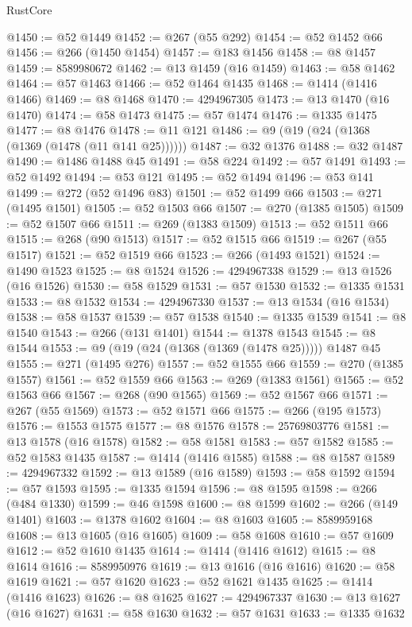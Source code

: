 \begin{lexlean}{RustCore}
\begin{coremodule}
@1450 := @52 @1449
@1452 := @267 (@55 @292)
@1454 := @52 @1452 @66
@1456 := @266 (@1450 @1454)
@1457 := @183 @1456
@1458 := @8 @1457
@1459 := 8589980672
@1462 := @13 @1459 (@16 @1459)
@1463 := @58 @1462
@1464 := @57 @1463
@1466 := @52 @1464 @1435
@1468 := @1414 (@1416 @1466)
@1469 := @8 @1468
@1470 := 4294967305
@1473 := @13 @1470 (@16 @1470)
@1474 := @58 @1473
@1475 := @57 @1474
@1476 := @1335 @1475
@1477 := @8 @1476
@1478 := @11 @121
@1486 := @9 (@19 (@24 (@1368 (@1369 (@1478 (@11 @141 @25))))))
@1487 := @32 @1376
@1488 := @32 @1487
@1490 := @1486 @1488 @45
@1491 := @58 @224
@1492 := @57 @1491
@1493 := @52 @1492
@1494 := @53 @121
@1495 := @52 @1494
@1496 := @53 @141
@1499 := @272 (@52 @1496 @83)
@1501 := @52 @1499 @66
@1503 := @271 (@1495 @1501)
@1505 := @52 @1503 @66
@1507 := @270 (@1385 @1505)
@1509 := @52 @1507 @66
@1511 := @269 (@1383 @1509)
@1513 := @52 @1511 @66
@1515 := @268 (@90 @1513)
@1517 := @52 @1515 @66
@1519 := @267 (@55 @1517)
@1521 := @52 @1519 @66
@1523 := @266 (@1493 @1521)
@1524 := @1490 @1523
@1525 := @8 @1524
@1526 := 4294967338
@1529 := @13 @1526 (@16 @1526)
@1530 := @58 @1529
@1531 := @57 @1530
@1532 := @1335 @1531
@1533 := @8 @1532
@1534 := 4294967330
@1537 := @13 @1534 (@16 @1534)
@1538 := @58 @1537
@1539 := @57 @1538
@1540 := @1335 @1539
@1541 := @8 @1540
@1543 := @266 (@131 @1401)
@1544 := @1378 @1543
@1545 := @8 @1544
@1553 := @9 (@19 (@24 (@1368 (@1369 (@1478 @25))))) @1487 @45
@1555 := @271 (@1495 @276)
@1557 := @52 @1555 @66
@1559 := @270 (@1385 @1557)
@1561 := @52 @1559 @66
@1563 := @269 (@1383 @1561)
@1565 := @52 @1563 @66
@1567 := @268 (@90 @1565)
@1569 := @52 @1567 @66
@1571 := @267 (@55 @1569)
@1573 := @52 @1571 @66
@1575 := @266 (@195 @1573)
@1576 := @1553 @1575
@1577 := @8 @1576
@1578 := 25769803776
@1581 := @13 @1578 (@16 @1578)
@1582 := @58 @1581
@1583 := @57 @1582
@1585 := @52 @1583 @1435
@1587 := @1414 (@1416 @1585)
@1588 := @8 @1587
@1589 := 4294967332
@1592 := @13 @1589 (@16 @1589)
@1593 := @58 @1592
@1594 := @57 @1593
@1595 := @1335 @1594
@1596 := @8 @1595
@1598 := @266 (@484 @1330)
@1599 := @46 @1598
@1600 := @8 @1599
@1602 := @266 (@149 @1401)
@1603 := @1378 @1602
@1604 := @8 @1603
@1605 := 8589959168
@1608 := @13 @1605 (@16 @1605)
@1609 := @58 @1608
@1610 := @57 @1609
@1612 := @52 @1610 @1435
@1614 := @1414 (@1416 @1612)
@1615 := @8 @1614
@1616 := 8589950976
@1619 := @13 @1616 (@16 @1616)
@1620 := @58 @1619
@1621 := @57 @1620
@1623 := @52 @1621 @1435
@1625 := @1414 (@1416 @1623)
@1626 := @8 @1625
@1627 := 4294967337
@1630 := @13 @1627 (@16 @1627)
@1631 := @58 @1630
@1632 := @57 @1631
@1633 := @1335 @1632

\end{coremodule}
\end{lexlean}

